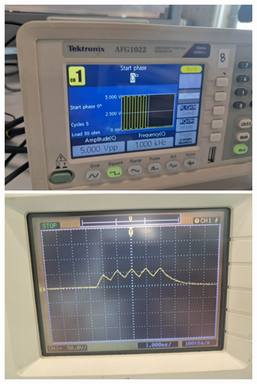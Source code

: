 \documentclass[a4paper,12pt]{article}
\begin{document}
\begin{figure}[h]
    \centering
    \begin{minipage}{0.45\textwidth}
        \centering
        \includegraphics[width=\textwidth]{figs/T1kpara.jpeg}
    \end{minipage}\hfill
    \begin{minipage}{0.45\textwidth}
        \centering
        \includegraphics[width=\textwidth]{figs/T1kplot.jpeg}
    \end{minipage}
\end{figure}
\end{document}
